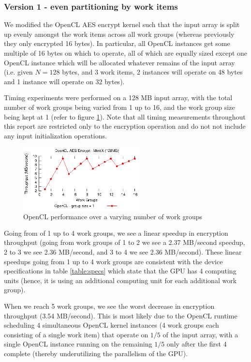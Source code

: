 \documentclass[conference,10pt]{IEEEtran}
\begin{document}
\subsubsection{Version 1 - even partitioning by work items}
\label{subsec:impl_partition}

We modified the OpenCL AES encrypt kernel such that the input array is split up evenly amongst the work 
items across all work groups (whereas previously they only encrypted 16 bytes). In particular, all OpenCL 
instances get some multiple of 16 bytes on which to operate, all of which are equally sized except one 
OpenCL instance which will be allocated whatever remains of the input array (i.e.  given $N = 128$ bytes, 
and 3 work items, 2 instances will operate on 48 bytes and 1 instance will operate on 32 bytes). 

Timing experiments were performed on a 128 MB input array, with the total number of work groups being 
varied from 1 up to 16, and the work group size being kept at 1 (refer to figure 
\ref{fig:num_work_groups}).  Note that all timing measurements throughout this report are restricted only 
to the encryption operation and do not not include any input initialization operations.

\begin{figure}[!t]
\centering
\includegraphics[width=2.5in]{../final/motox/4.2/sample_opencl_aes_global_worksize.128MB.16_max_global_worksize.again.report.eps}
\caption{OpenCL performance over a varying number of work groups}
\label{fig:num_work_groups}
\end{figure}

Going from of 1 up to 4 work groups, we see a linear speedup in encryption throughput (going from work 
groups of 1 to 2 we see a 2.37 MB/second speedup, 2 to 3 we see 2.36 MB/second, and 3 to 4 we see 2.36 
MB/second). These linear speedups going from 1 up to 4 work groups are consistent with the device 
specifications in table \ref{table:specs} which state that the GPU has 4 computing units (hence, it is 
using an additional computing unit for each additional work group).

When we reach 5 work groups, we see the worst decrease in encryption throughput (3.54 MB/second).  This is 
most likely due to the OpenCL runtime scheduling 4 simultaneous OpenCL kernel instances (4 work groups each 
consisting of a single work item) that operate on $1/5$ of the input array, with a single OpenCL instance 
running on the remaining $1/5$ only after the first 4 complete (thereby underutilizing the parallelism of 
the GPU).
\end{document}
